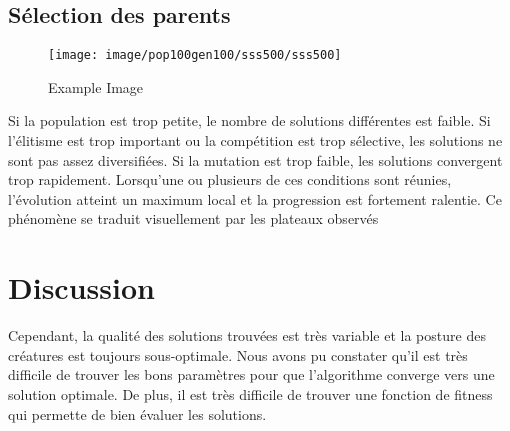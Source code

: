 \documentclass[journal, a4paper]{IEEEtran}
\begin{document}
	\subsection{Sélection des parents}

	\begin{figure}
	  \texttt{[image: image/pop100gen100/sss500/sss500]}
	  \caption{Example Image}
	  \label{fig:sss500}
	\end{figure}
Si la population est trop petite, le nombre de solutions différentes
est faible.
Si l'élitisme est trop important ou la compétition est trop sélective,
les solutions
ne sont pas assez diversifiées.
Si la mutation est trop faible, les solutions convergent trop rapidement.
Lorsqu'une ou plusieurs de ces conditions sont réunies, l'évolution
atteint un maximum local et la progression est fortement ralentie.
Ce phénomène se traduit visuellement par les plateaux observés


	\section{Discussion}
	Cependant, la qualité des solutions trouvées est très variable et
	la posture des créatures est toujours sous-optimale.
	Nous avons pu constater qu'il est très difficile
	de trouver les bons paramètres pour que l'algorithme converge
	vers une solution optimale. De plus, il est très difficile
	de trouver une fonction de fitness qui permette de bien
	évaluer les solutions.
\end{document}
